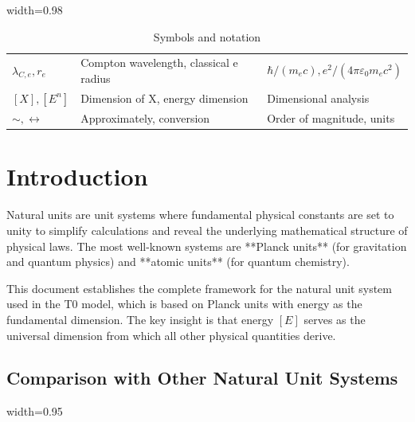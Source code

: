 {\begin{table}[htbp]
\begin{adjustbox}{width=0.98\textwidth}
\begin{tabular}{lll}
					$\lambda_{C,e}, r_e$ & Compton wavelength, classical e radius & $\hbar/(m_e c), e^2/(4\pi\varepsilon_0 m_e c^2)$ \\
					$[X], [E^n]$ & Dimension of X, energy dimension & Dimensional analysis \\
					$\sim, \leftrightarrow$ & Approximately, conversion & Order of magnitude, units \\
					\bottomrule
				\end{tabular}
			\end{adjustbox}
			\caption{Symbols and notation}
			\label{tab:symbols}
		\end{table}
	}

	\section{Introduction}
	
	Natural units are unit systems where fundamental physical constants are set to unity to simplify calculations and reveal the underlying mathematical structure of physical laws. The most well-known systems are **Planck units** (for gravitation and quantum physics) and **atomic units** (for quantum chemistry).
	
	This document establishes the complete framework for the natural unit system used in the T0 model, which is based on Planck units with energy as the fundamental dimension. The key insight is that energy $[E]$ serves as the universal dimension from which all other physical quantities derive.
	
	\subsection{Comparison with Other Natural Unit Systems}
	
	\begin{table}[htbp]
		\centering
		\begin{adjustbox}{width=0.95\textwidth}
		\end{adjustbox}
		\caption{Comparison of natural unit systems}
		\label{tab:unit_systems}
	\end{table}
	
